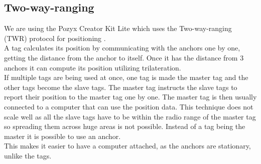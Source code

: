 \subsection{Two-way-ranging} \label{pozyx:TWR}
We are using the Pozyx Creator Kit Lite which uses the Two-way-ranging (TWR) protocol for positioning \cite{pozyx-Positioning}.\\
A tag calculates its position by communicating with the anchors one by one, getting the distance from the anchor to itself.
Once it has the distance from 3 anchors it can compute its position utilizing trilateration.
\\
If multiple tags are being used at once, one tag is made the master tag and the other tags become the slave tags.
The master tag instructs the slave tags to report their position to the master tag one by one.
The master tag is then usually connected to a computer that can use the position data.
This technique does not scale well as all the slave tags have to be within the radio range of the master tag so spreading them across huge areas is not possible.
Instead of a tag being the master it is possible to use an anchor.\\
This makes it easier to have a computer attached, as the anchors are stationary, unlike the tags.
